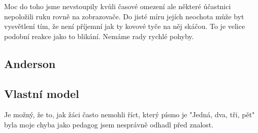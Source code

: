 Moc do toho jsme nevstoupily kvůli časové omezení ale některé účastnici nepoložili ruku rovně na zobrazovače.  Do jisté míru jejích neochota může byt vysvětlení tím, že není příjemní jak ty kovové tyče na něj skáčou.  To je velice podobní reakce jako to blikání.  Nemáme rady rychlé pohyby.

\subsection{Anderson}
\subsection{Vlastní model}
Je možný, že to, jak žáci často nemohli říct, který písmo je "Jedná, dva, tři, pět" byla moje chyba jako pedagog jsem nesprávně odhadl před znalost.
